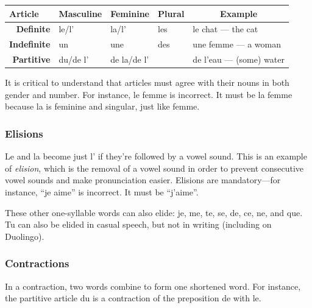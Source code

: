 \begin{tabular}{|r|l|l|l|l|}
\hline
\multicolumn{1}{|l|}{\textbf{Article}} & \multicolumn{1}{c|}{\textbf{Masculine}} & \multicolumn{1}{c|}{\textbf{Feminine}} & \multicolumn{1}{c|}{\textbf{Plural}} & \multicolumn{1}{c|}{\textbf{Example}} \\ \hline
\textbf{Definite}                      & le/l'                                   & la/l'                                  & les                                  & le chat — the cat                     \\ \hline
\textbf{Indefinite}                    & un                                      & une                                    & des                                  & une femme — a woman                   \\ \hline
\textbf{Partitive}                     & du/de l'                                & de la/de l'                            &                                      & de l'eau — (some) water               \\ \hline
\end{tabular}

It is critical to understand that articles must agree with their nouns in both gender and number. For instance, le femme is incorrect. It must be la femme because la is feminine and singular, just like femme.

\subsubsection{Elisions}

Le and la become just l' if they're followed by a vowel sound. This is an example of \textit{elision}, which is the removal of a vowel sound in order to prevent consecutive vowel sounds and make pronunciation easier. Elisions are mandatory---for instance, ``je aime'' is incorrect. It must be ``j'aime''.

These other one-syllable words can also elide: je, me, te, se, de, ce, ne, and que. Tu can also be elided in casual speech, but not in writing (including on Duolingo).

\subsubsection{Contractions}

In a contraction, two words combine to form one shortened word. For instance, the partitive article du is a contraction of the preposition de with le.

